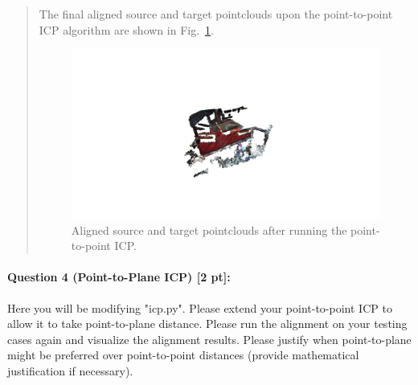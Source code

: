 \documentclass[11pt]{article}
\begin{document}
\begin{quote}
The final aligned source and target pointclouds upon the point-to-point ICP algorithm are shown in Fig.~\ref{fig:pcds_icp_point2point}.
\begin{figure}[h]
    \centering
    \includegraphics[width=1.0\linewidth]{pcds_icp_point2point.jpg}
    \caption{Aligned source and target pointclouds after running the point-to-point ICP.}
    \label{fig:pcds_icp_point2point}
\end{figure}

\end{quote}


\paragraph{Question 4 (Point-to-Plane ICP) [2 pt]:} Here you will be modifying "icp.py". Please extend your point-to-point ICP to allow it to take point-to-plane distance. Please run the alignment on your testing cases again and visualize the alignment results. Please justify when point-to-plane might be preferred over point-to-point distances (provide mathematical justification if necessary). 
\end{document}
